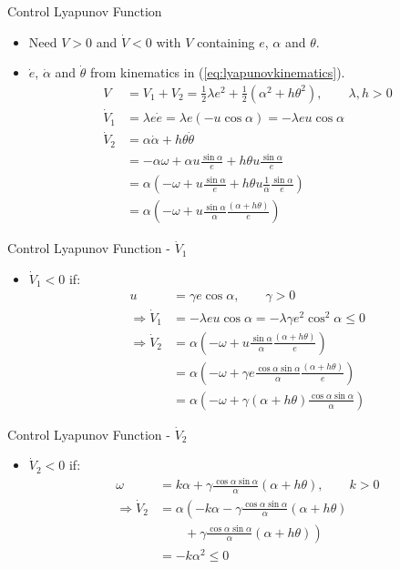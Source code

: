 \documentclass[hyperref={pdfpagelabels=false}]{beamer}
\begin{document}
\begin{frame}{Control Lyapunov Function}
\begin{itemize}
\item Need $V>0$ and $\dot{V}<0$ with $V$ containing $e$, $\alpha$ and $\theta$.
\item $\dot{e}$, $\dot{\alpha}$ and $\dot{\theta}$ from kinematics in (\ref{eq:lyapunovkinematics}).
\begin{align*}
V &= V_1 + V_2 = \frac{1}{2}\lambda e^2 + \frac{1}{2}\left(\alpha^2+h\theta^2\right), \qquad \lambda,h>0 \\
\dot{V}_1 &= \lambda e\dot{e} = \lambda e (-u\cos\alpha) = -\lambda eu\cos\alpha \\
\dot{V}_2 &= \alpha\dot{\alpha}+h\theta\dot{\theta} \\
&= -\alpha\omega + \alpha u\frac{\sin\alpha}{e} + h\theta u\frac{\sin\alpha}{e} \\
&= \alpha\left(-\omega + u\frac{\sin\alpha}{e} + h\theta u\frac{1}{\alpha}\frac{\sin\alpha}{e}\right) \\
&= \alpha\left(-\omega + u\frac{\sin\alpha}{\alpha}\frac{(\alpha+h\theta)}{e}\right)
\end{align*}
\end{itemize}
\end{frame}

\begin{frame}{Control Lyapunov Function - $\dot{V}_1$}
\begin{itemize}
\item $\dot{V}_1<0$ if:
\begin{align*}
u &= \gamma e\cos\alpha, \qquad \gamma>0 \\
\Rightarrow \dot{V}_1 &= -\lambda eu\cos\alpha = -\lambda\gamma e^2\cos^2\alpha \leq 0 \\
\Rightarrow \dot{V}_2 &= \alpha\left(-\omega+u\frac{\sin\alpha}{\alpha}\frac{(\alpha+h\theta)}{e}\right) \\
&= \alpha\left(-\omega+\gamma e\frac{\cos\alpha\sin\alpha}{\alpha}\frac{(\alpha+h\theta)}{e}\right) \\
&= \alpha\left(-\omega+\gamma(\alpha+h\theta)\frac{\cos\alpha\sin\alpha}{\alpha}\right)
\end{align*}
\end{itemize}
\end{frame}

\begin{frame}{Control Lyapunov Function - $\dot{V}_2$}
\begin{itemize}
\item $\dot{V}_2<0$ if:
\begin{align*}
\omega &= k\alpha + \gamma\frac{\cos\alpha\sin\alpha}{\alpha}\left(\alpha+h\theta\right), \qquad k>0 \\
\Rightarrow \dot{V}_2 &= \alpha\left(-k\alpha-\gamma\frac{\cos\alpha\sin\alpha}{\alpha}(\alpha+h\theta)\right. \\
&\qquad + \left.\gamma\frac{\cos\alpha\sin\alpha}{\alpha}(\alpha+h\theta)\right) \\
&= -k\alpha^2 \leq 0
\end{align*}
\end{itemize}
\end{frame}
\end{document}
